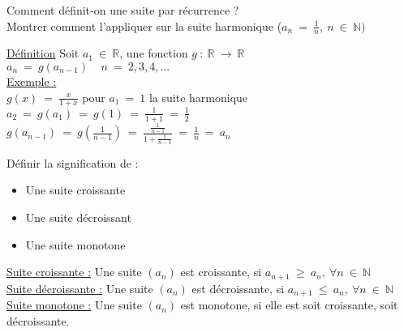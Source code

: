 \documentclass[12pt]{article}
\newcommand*{\xfield}[1]{\begin{mdframed}\centering #1\end{mdframed}\bigskip}
\newenvironment{note}{}{}
\begin{document}
\begin{note}
    \xfield{
        Comment définit-on une suite par récurrence ?\\
        Montrer comment l'appliquer sur la suite harmonique ($a_n\ =\ \frac{1}{n},\ n\ \in\ \mathbb{N})$
    }
    \xfield{
        \underline{Définition} Soit $a_1\ \in\ \mathbb{R}$, une fonction $g\ :\ \mathbb{R}\ \rightarrow\ \mathbb{R}$\\
        $a_n\ =\ g(a_{n-1})\ \ \ \ \ n\ =\ 2,3,4,...$\\
        \underline{Exemple : }\\
        $g(x)\ =\ \frac{x}{1+x}$ pour $a_1\ =\ 1$ la suite harmonique\\
        $a_2\ =\ g(a_1)\ =\ g(1)\ =\ \frac{1}{1+1}\ =\ \frac{1}{2}$\\
        $g(a_{n-1})\ =\ g(\frac{1}{n-1})\ =\ \frac{\frac{1}{n-1}}{1+ \frac{1}{n-1}}\ =\ \frac{1}{n}\ =\ a_n$}
\end{note}

\begin{note}
    \xfield{
        Définir la signification de :
        \begin{itemize}
        \item Une suite croissante
        \item Une suite décroissant
        \item Une suite monotone
        \end{itemize}
    }
    \xfield{
        \underline{Suite croissante :} Une suite $(a_n)$ est croissante, si $a_{n+1}\ \ge\ a_n,\ \forall n\ \in\ \mathbb{N}$\\
        \underline{Suite décroissante :} Une suite $(a_n)$ est décroissante, si $a_{n+1}\ \le\ a_n,\ \forall n\ \in\ \mathbb{N}$\\
                \underline{Suite monotone :} Une suite $(a_n)$ est monotone, si elle est soit croissante, soit décroissante.}
\end{note}
\end{document}
